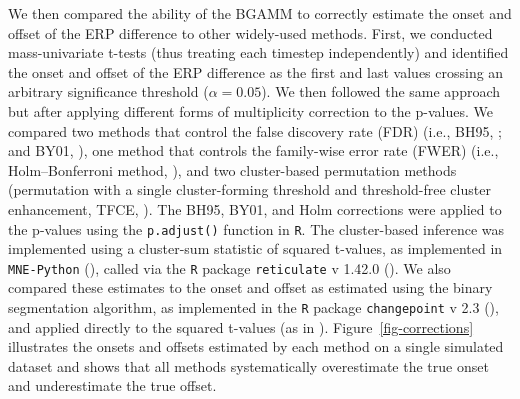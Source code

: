 \documentclass[
  man,
  floatsintext,
  longtable,
  a4paper,
  nolmodern,
  notxfonts,
  notimes,
  colorlinks=true,linkcolor=blue,citecolor=blue,urlcolor=blue]{apa7}
\begin{document}
We then compared the ability of the BGAMM to correctly estimate the
onset and offset of the ERP difference to other widely-used methods.
First, we conducted mass-univariate t-tests (thus treating each timestep
independently) and identified the onset and offset of the ERP difference
as the first and last values crossing an arbitrary significance
threshold (\(\alpha = 0.05\)). We then followed the same approach but
after applying different forms of multiplicity correction to the
p-values. We compared two methods that control the false discovery rate
(FDR) (i.e., BH95, ; and BY01, ), one method that controls the family-wise error rate (FWER)
(i.e., Holm--Bonferroni method, ),
and two cluster-based permutation methods (permutation with a single
cluster-forming threshold and threshold-free cluster enhancement, TFCE,
). The BH95, BY01,
and Holm corrections were applied to the p-values using the
\texttt{p.adjust()} function in \texttt{R}. The cluster-based inference
was implemented using a cluster-sum statistic of squared t-values, as
implemented in \texttt{MNE-Python}
(), called via the \texttt{R}
package \texttt{reticulate} v 1.42.0 (). We also compared these estimates to the onset and offset as
estimated using the binary segmentation algorithm, as implemented in the
\texttt{R} package \texttt{changepoint} v 2.3
(), and applied directly
to the squared t-values (as in
).
Figure~\ref{fig-corrections} illustrates the onsets and offsets
estimated by each method on a single simulated dataset and shows that
all methods systematically overestimate the true onset and underestimate
the true offset.
\end{document}
